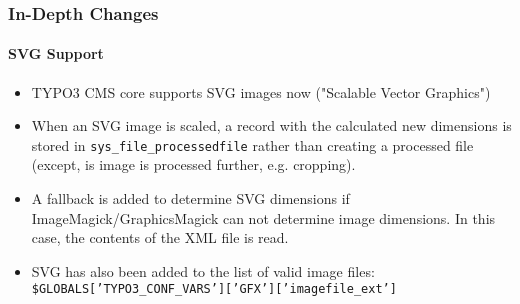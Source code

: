 %
\begin{frame}[fragile]
	\frametitle{In-Depth Changes}
	\framesubtitle{SVG Support}

	\begin{itemize}
		\item TYPO3 CMS core supports SVG images now ("Scalable Vector Graphics")

		\item When an SVG image is scaled, a record with the calculated new dimensions
			is stored in \texttt{sys\_file\_processedfile} rather than creating a
			processed file\newline
			\small(except, is image is processed further, e.g. cropping)\normalsize.

		\item A fallback is added to determine SVG dimensions if ImageMagick/GraphicsMagick
			can not determine image dimensions. In this case, the contents of the XML file
			is read.

		\item SVG has also been added to the list of valid image files:\newline
			\texttt{\$GLOBALS['TYPO3\_CONF\_VARS']['GFX']['imagefile\_ext']}

	\end{itemize}

\end{frame}

